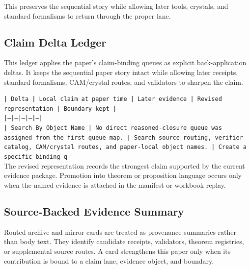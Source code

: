 \documentclass[11pt]{article}
\begin{document}
This preserves the sequential story while allowing later tools, crystals, and
standard formalisms to return through the proper lane.

\subsection*{Claim Delta Ledger}

This ledger applies the paper's claim-binding queues as explicit back-application
deltas. It keeps the sequential paper story intact while allowing later
receipts, standard formalisms, CAM/crystal routes, and validators to sharpen the
claim.

\noindent\texttt{| Delta | Local claim at paper time | Later evidence | Revised representation | Boundary kept |}\\
\noindent\texttt{|---|---|---|---|---|}\\
\noindent\texttt{| Search By Object Name | No direct reasoned-closure queue was assigned from the first queue map. | Search source routing, verifier catalog, CAM/crystal routes, and paper-local object names. | Create a specific binding q}\\

The revised representation records the strongest claim supported by the current evidence package. Promotion into theorem or proposition language occurs only when the named evidence is attached in the manifest or workbook replay.

\subsection*{Source-Backed Evidence Summary}

Routed archive and mirror cards are treated as provenance summaries rather than
body text. They identify candidate receipts, validators, theorem registries, or
supplemental source routes. A card strengthens this paper only when its
contribution is bound to a claim lane, evidence object, and boundary.
\end{document}
